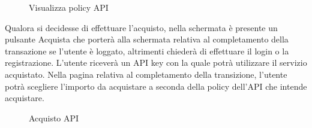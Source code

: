 \label{Visualizza policy API}
\begin{figure}[H]
	\centering
	\caption{Visualizza policy API}
\end{figure}

Qualora si decidesse di effettuare l'acquisto, nella schermata è presente un pulsante Acquista che porterà alla schermata relativa al completamento della transazione se l'utente è loggato, altrimenti chiederà di effettuare il login o la registrazione. L'utente riceverà un API key con la quale potrà utilizzare il servizio acquistato. Nella pagina relativa al completamento della transizione, l'utente potrà scegliere l'importo da acquistare a seconda della policy dell'API che intende acquistare. 

\label{Acquisto API}
\begin{figure}[H]
	\centering
	\caption{Acquisto API}
\end{figure}